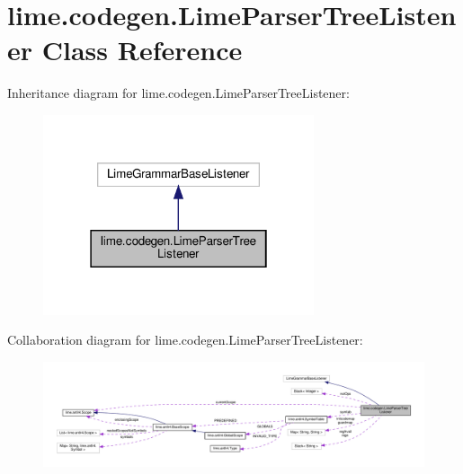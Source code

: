 \hypertarget{classlime_1_1codegen_1_1LimeParserTreeListener}{}\section{lime.\+codegen.\+Lime\+Parser\+Tree\+Listener Class Reference}
\label{classlime_1_1codegen_1_1LimeParserTreeListener}


Inheritance diagram for lime.\+codegen.\+Lime\+Parser\+Tree\+Listener\+:
\nopagebreak
\begin{figure}[H]
\begin{center}
\leavevmode
\includegraphics[width=226pt]{classlime_1_1codegen_1_1LimeParserTreeListener__inherit__graph}
\end{center}
\end{figure}


Collaboration diagram for lime.\+codegen.\+Lime\+Parser\+Tree\+Listener\+:
\nopagebreak
\begin{figure}[H]
\begin{center}
\leavevmode
\includegraphics[width=350pt]{classlime_1_1codegen_1_1LimeParserTreeListener__coll__graph}
\end{center}
\end{figure}
